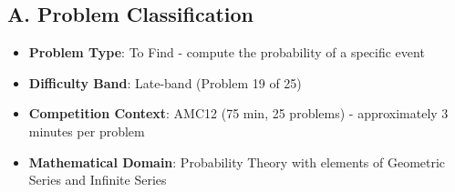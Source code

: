 \documentclass[11pt]{article}
\begin{document}
\begin{problemconfigbox}
\subsection*{A. Problem Classification}
\begin{itemize}[leftmargin=*]
    \item \textbf{Problem Type}: To Find - compute the probability of a specific event
    \item \textbf{Difficulty Band}: Late-band (Problem 19 of 25)
    \item \textbf{Competition Context}: AMC12 (75 min, 25 problems) - approximately 3 minutes per problem
    \item \textbf{Mathematical Domain}: Probability Theory with elements of Geometric Series and Infinite Series
\end{itemize}


\end{problemconfigbox}
\end{document}
